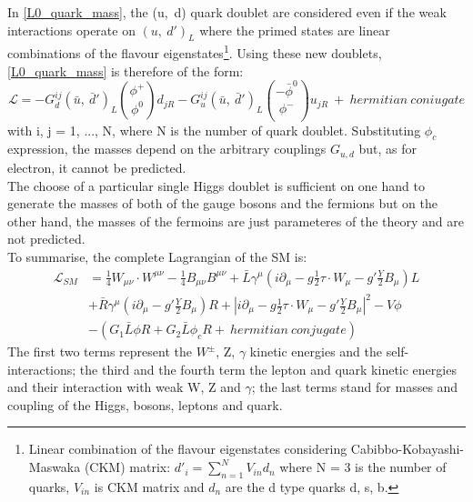 In \ref{L0_quark_mass}, the (u,\ d) quark doublet are considered even if the weak interactions operate on $(u,\  d')_{L}$ where the primed states are  linear combinations of the flavour eigenstates\footnote{Linear combination of the flavour eigenstates considering Cabibbo-Kobayashi-Maswaka (CKM) matrix: $d'_i = \sum_{n=1}^NV_{in}d_n  $ where N = 3 is the number of quarks, $V_{in}$ is CKM matrix and $d_{n}$ are the d type quarks d, s, b.}. Using these new doublets, \ref{L0_quark_mass} is therefore of the form:
\begin{equation}
\mathcal{L}= -G_{d}^{ij}(\bar{u}, \ \bar{d}')_{L}{\phi^{+} \choose \phi^{0}}d_{jR}-G_{u}^{ij}(\bar{u}, \ \bar{d}')_{L}{-\bar{\phi}^{0} \choose \phi^{-}}u_{jR}\ +\ hermitian\  coniugate
\label{L0_quark_mass_2}
\end{equation}
with i, j = 1, ..., N,  where N is the number of quark doublet. Substituting $\phi_{c}$ expression, the masses depend on the arbitrary couplings $G_{u,d}$ but, as for electron, it cannot be predicted.\\
The choose of a particular single Higgs doublet is sufficient on one hand to generate the masses of both of the gauge bosons and the fermions but on the other hand, the masses of the fermoins are just parameteres of the theory and are not predicted. 
\\ To summarise, the complete Lagrangian of the SM is:
\begin{equation}
\begin{split}
\mathcal{L}_{SM} &= \frac{1}{4}W_{\mu\nu}\cdot W^{\mu\nu} - \frac{1}{4}B_{\mu\nu}B^{\mu\nu} + \bar{L}\gamma^{\mu}(i\partial_{\mu}-g\frac{1}{2}\tau \cdot W_{\mu} -g'\frac{Y}{2}B_{\mu})L \\
&+\bar{R}\gamma^{\mu}(i\partial_{\mu}-g'\frac{Y}{2}B_{\mu})R+|i\partial_{\mu}-g\frac{1}{2}\tau \cdot W_{\mu} -g'\frac{Y}{2}B_{\mu}|^{2} -V{\phi} \\
&-(G_{1}\bar{L}\phi R+G_{2}\bar{L} \phi_{c}R +\ hermitian\ conjugate)
\label{L0_SM}
\end{split}
\end{equation}
The first two terms represent the $W^{\pm}$, Z, $\gamma$ kinetic energies and the self-interactions; the third and the fourth term the lepton and quark kinetic energies and their interaction with weak W, Z and $\gamma$; the last terms stand for masses and coupling of the Higgs, bosons, leptons and quark. \\

